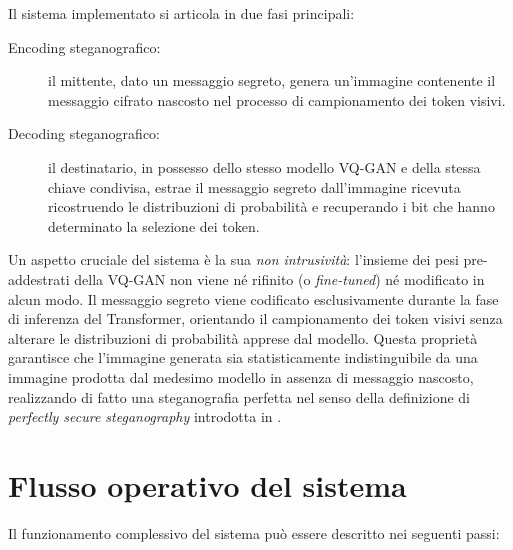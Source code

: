 Il sistema implementato si articola in due fasi principali:
\begin{description}
	\item[Encoding steganografico:] il mittente, dato un messaggio segreto, genera un'immagine contenente il messaggio cifrato nascosto nel processo di campionamento dei token visivi.
	\item[Decoding steganografico:] il destinatario, in possesso dello stesso modello VQ-GAN e della stessa chiave condivisa, estrae il messaggio segreto dall'immagine ricevuta ricostruendo le distribuzioni di probabilità e recuperando i bit che hanno determinato la selezione dei token.
\end{description}

Un aspetto cruciale del sistema è la sua \emph{non intrusività}: l'insieme dei pesi pre-addestrati della VQ-GAN non viene né rifinito (o \emph{fine-tuned}) né modificato in alcun modo. Il messaggio segreto viene codificato esclusivamente durante la fase di inferenza del Transformer, orientando il campionamento dei token visivi senza alterare le distribuzioni di probabilità apprese dal modello. Questa proprietà garantisce che l'immagine generata sia statisticamente indistinguibile da una immagine prodotta dal medesimo modello in assenza di messaggio nascosto, realizzando di fatto una steganografia perfetta nel senso della definizione di \emph{perfectly secure steganography} introdotta in \cite{kaptchuk-2021}.

\section{Flusso operativo del sistema}
\label{sec:flusso-operativo}

Il funzionamento complessivo del sistema può essere descritto nei seguenti passi:

